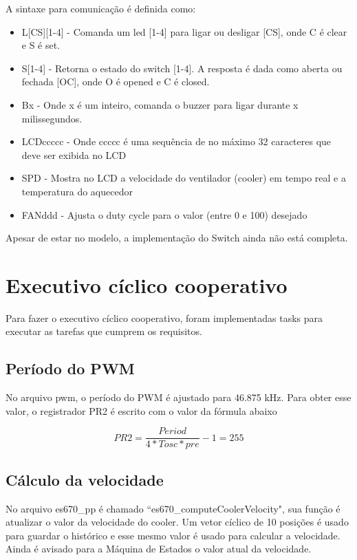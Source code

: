 \documentclass{article}
\begin{document}
A sintaxe para comunicação é definida como:
\begin{itemize}
\item L[CS][1-4] - Comanda um led [1-4] para ligar ou desligar [CS], onde C é clear e S é set.
\item S[1-4] - Retorna o estado do switch [1-4]. A resposta é dada como aberta ou fechada [OC], onde O é opened e C é closed.
\item Bx - Onde x é um inteiro, comanda o buzzer para ligar durante x milissegundos.
\item LCDccccc - Onde ccccc é uma sequência de no máximo 32 caracteres que deve ser exibida no LCD
\item SPD - Mostra no LCD a velocidade do ventilador (cooler) em tempo real e a temperatura do aquecedor
\item FANddd - Ajusta o duty cycle para o valor (entre 0 e 100) desejado
\end{itemize}

Apesar de estar no modelo, a implementação do Switch ainda não está completa.


\section{Executivo cíclico cooperativo}

Para fazer o executivo cíclico cooperativo, foram implementadas tasks para executar as tarefas que cumprem os requisitos.

\subsection{Período do PWM}
No arquivo pwm, o período do PWM é ajustado para 46.875 kHz. Para obter esse valor, o registrador PR2 é escrito com o valor da fórmula abaixo

\begin{equation}
PR2 = \frac{Period}{4*Tosc*pre}-1 = 255
\end{equation}

\subsection{Cálculo da velocidade}
No arquivo es670\_pp é chamado ``es670\_computeCoolerVelocity", sua função é atualizar o valor da velocidade do cooler. Um vetor cíclico de 10 posições é usado para guardar o histórico e esse mesmo valor é usado para calcular a velocidade. Ainda é avisado para a Máquina de Estados o valor atual da velocidade.
\end{document}
